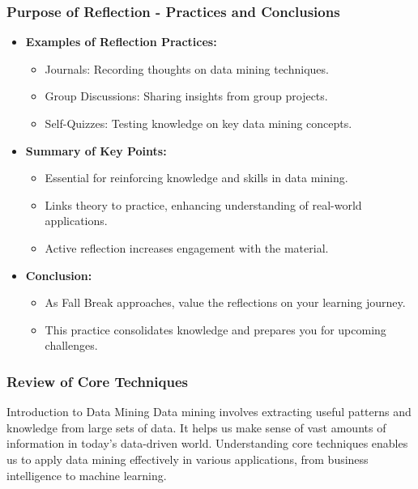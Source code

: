 \documentclass[aspectratio=169]{beamer}
\begin{document}
\begin{frame}[fragile]
    \frametitle{Purpose of Reflection - Practices and Conclusions}
    \begin{itemize}
        \item \textbf{Examples of Reflection Practices:}
        \begin{itemize}
            \item Journals: Recording thoughts on data mining techniques.
            \item Group Discussions: Sharing insights from group projects.
            \item Self-Quizzes: Testing knowledge on key data mining concepts.
        \end{itemize}
        
        \item \textbf{Summary of Key Points:}
        \begin{itemize}
            \item Essential for reinforcing knowledge and skills in data mining.
            \item Links theory to practice, enhancing understanding of real-world applications.
            \item Active reflection increases engagement with the material.
        \end{itemize}
        
        \item \textbf{Conclusion:}
        \begin{itemize}
            \item As Fall Break approaches, value the reflections on your learning journey.
            \item This practice consolidates knowledge and prepares you for upcoming challenges.
        \end{itemize}
    \end{itemize}
\end{frame}

\begin{frame}[fragile]
  \frametitle{Review of Core Techniques}
  \begin{block}{Introduction to Data Mining}
    Data mining involves extracting useful patterns and knowledge from large sets of data. It helps us make sense of vast amounts of information in today’s data-driven world. Understanding core techniques enables us to apply data mining effectively in various applications, from business intelligence to machine learning.
  \end{block}
\end{frame}
\end{document}
